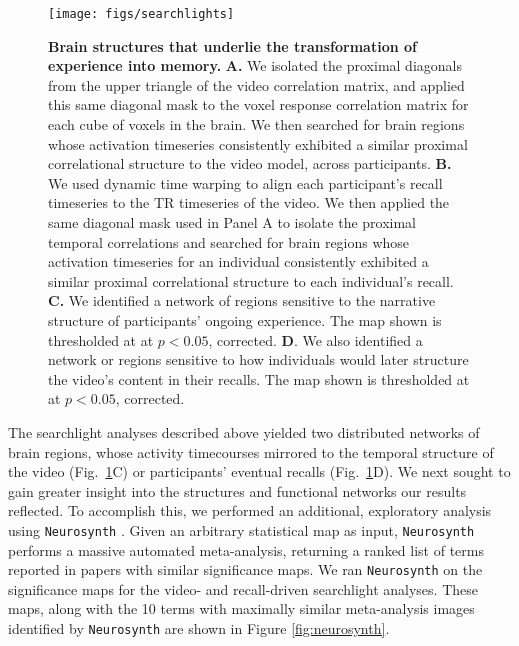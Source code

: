 \documentclass{article}
\begin{document}
\begin{figure}[t]
\centering
\texttt{[image: figs/searchlights]}
\caption{\small \textbf{Brain structures that underlie the transformation of experience into memory.} \textbf{A.} We isolated the proximal diagonals from the upper triangle of the video correlation matrix, and applied this same diagonal mask to the voxel response correlation matrix for each cube of voxels in the brain. We then searched for brain regions whose activation timeseries consistently exhibited a similar proximal correlational structure to the video model, across participants.  \textbf{B.} We used dynamic time warping \citep{BernClif94} to align each participant's recall timeseries to the TR timeseries of the video.  We then applied the same diagonal mask used in Panel A to isolate the proximal temporal correlations and searched for brain regions whose activation timeseries for an individual consistently exhibited a similar proximal correlational structure to each individual's recall.  \textbf{C.} We identified a network of regions sensitive to the narrative structure of participants' ongoing experience.  The map shown is thresholded at at $p < 0.05$, corrected.  \textbf{D}. We also identified a network or regions sensitive to how individuals would later structure the video's content in their recalls.  The map shown is thresholded at at $p < 0.05$, corrected.}
\label{fig:brainz}
\end{figure}

The searchlight analyses described above yielded two distributed networks of brain regions, whose activity timecourses mirrored to the temporal structure of the video (Fig.~\ref{fig:brainz}C) or participants' eventual recalls (Fig.~\ref{fig:brainz}D).  We next sought to gain greater insight into the structures and functional networks our results reflected.  To accomplish this, we performed an additional, exploratory analysis using \texttt{Neurosynth} \citep{YarkEtal11}.  Given an arbitrary statistical map as input, \texttt{Neurosynth} performs a massive automated meta-analysis, returning a ranked list of terms reported in papers with similar significance maps. We ran \texttt{Neurosynth} on the significance maps for the video- and recall-driven searchlight analyses. These maps, along with the 10 terms with maximally similar meta-analysis images identified by \texttt{Neurosynth} are shown in Figure \ref{fig:neurosynth}.
\end{document}
